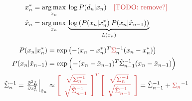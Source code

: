 \begin{algorithm}
\begin{equation*}
\begin{aligned}
x_n^* &= \argmax_{x_n} \: \log P(d_n|x_n)  \quad \text{\TODO{remove?}}
\\
\hat{x}_n &= \argmax_{x_n} \: \underbrace{\log \left( P(x_n|x_n^*) \: P(x_n |\hat{x}_{n - 1}) \right)}_{L(x_n)}    
\\
\end{aligned}
\end{equation*}

\begin{equation*}
\begin{aligned}
P(x_n |x_n^*) &= \exp \left( - (x_n - x_n^* )^T \todo{\Sigma}_n^{-1}(x_n - x_n^* )\right)
\\
P(x_n |\hat{x}_{n - 1}) &= 
\exp \left( - (x_n - \hat{x}_{n - 1} )^T \hat{\Sigma}_{n - 1}^{-1} (x_n - \hat{x}_{n - 1} )\right)
\\
\hat{\Sigma}_n^{-1} = 
\left.\tfrac{\partial^2 L}{\partial x_n^2}\right|_{\hat{x}_n} &\approx 
\todo{
\left[
    \begin{array}{cc}
        \sqrt{\Sigma_n^{-1}} \\
        \sqrt{\hat{\Sigma}_{n - 1}^{-1}} \\
    \end{array}
\right]^T
\left[
    \begin{array}{c}
        \sqrt{\Sigma_n^{-1}} \\
        \sqrt{\hat{\Sigma}_{n - 1}^{-1}} \\
    \end{array}
\right]
} %
=
\hat{\Sigma}_{n-1}^{-1}  + \todo{\Sigma_{n}}^{-1}
\end{aligned}
\end{equation*}
\caption{
% 
% 
Inter-frame regression formulated as a probabilistic KF. 
% 
% 
}
\label{alg:interframe}
\label{alg:kf-like} %
\label{tab:kf-like} %
\end{algorithm}